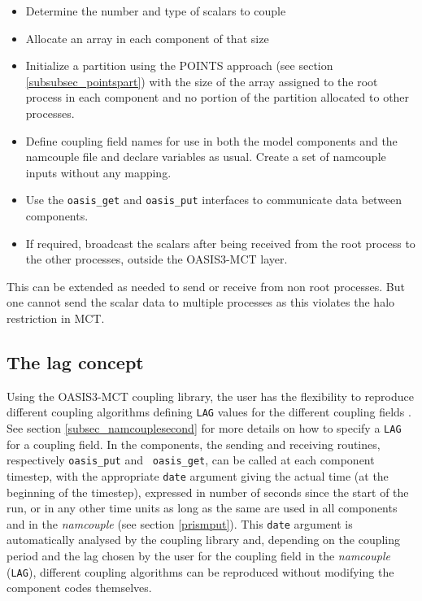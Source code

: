 \begin{itemize}
\item Determine the number and type of scalars to couple
\item Allocate an array in each component of that size
\item Initialize a partition using the POINTS approach (see section \ref{subsubsec_pointspart}) with the size of the array assigned to the root process in each component and no portion of the partition allocated to other processes.
\item Define coupling field names for use in both the model components and the namcouple file and declare variables as usual.  Create a set of namcouple inputs without any mapping.
\item Use the {\tt oasis\_get} and {\tt oasis\_put} interfaces to communicate data between components.
\item If required, broadcast the scalars after being received from the root process to the other processes, outside the OASIS3-MCT layer.
\end{itemize}

This can be extended as needed to send or receive from non root processes.  But
one cannot send the scalar data to multiple processes as this violates the halo
restriction in MCT.  

\vspace{-0.3cm}
\subsection{The lag concept}
\label{subsec_lag}

Using the OASIS3-MCT coupling library, the user has the flexibility
to reproduce different coupling algorithms defining {\tt LAG} values for the different coupling fields . See section \ref{subsec_namcouplesecond} for more details on how to specify a {\tt LAG} for a coupling field.
In the components, the
sending and receiving routines, respectively {\tt oasis\_put} and {\tt
  oasis\_get}, can be called at each component timestep, with the
appropriate {\tt date} argument giving the actual time (at the
beginning of the timestep), expressed in number of seconds since the
start of the run, or in any other time units as long as the same are
used in all components and in the {\it namcouple} (see section
\ref{prismput}). This {\tt date} argument is automatically analysed by
the coupling library and, depending on the coupling period and the lag chosen by the user for the coupling field in the {\it namcouple} ({\tt LAG}), different coupling algorithms can be reproduced
without modifying the component codes themselves.

